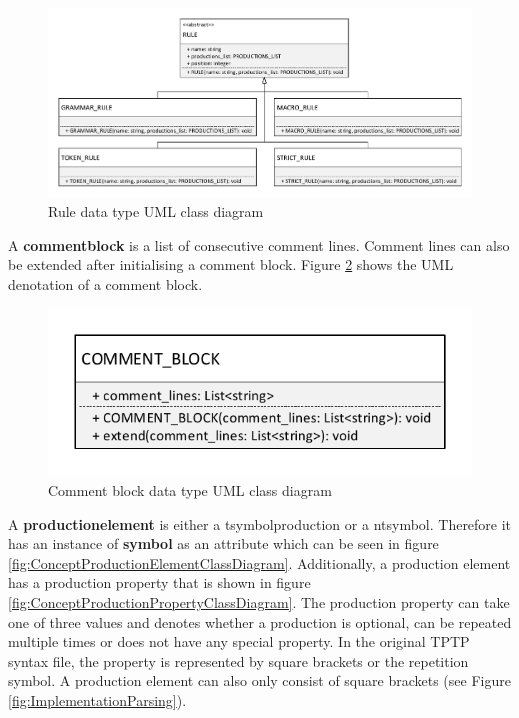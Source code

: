 \begin{figure}[H]
\centering
\includegraphics[width=1\textwidth]{images/Concept_uml_data_types_rules.pdf}
\caption{Rule data type UML class diagram}
\label{fig:ConceptRulesClassDiagram}
\end{figure}

A \textbf{comment\textunderscore block} is a list of consecutive comment lines. Comment lines can also be extended after initialising a comment block. Figure \ref{fig:ConceptCommentBlockClassDiagram} shows the UML denotation of a comment block.

\begin{figure}[H]
\centering
\includegraphics[width=.5\textwidth]{images/Concept_uml_data_types_comment_block.pdf}
\caption{Comment block data type UML class diagram}
\label{fig:ConceptCommentBlockClassDiagram}
\end{figure}


A \textbf{production\textunderscore element} is either a t\textunderscore symbol\textunderscore production or a nt\textunderscore symbol. Therefore it has an instance of \textbf{symbol} as an attribute which can be seen in figure \ref{fig:ConceptProductionElementClassDiagram}. Additionally, a production element has a production property that is shown in figure \ref{fig:ConceptProductionPropertyClassDiagram}.
The production property can take one of three values and denotes whether a production is optional, can be repeated multiple times or does not have any special property.
In the original TPTP syntax file, the property is represented by square brackets or the repetition symbol. A production element can also only consist of square brackets (see Figure \ref{fig:ImplementationParsing}).

